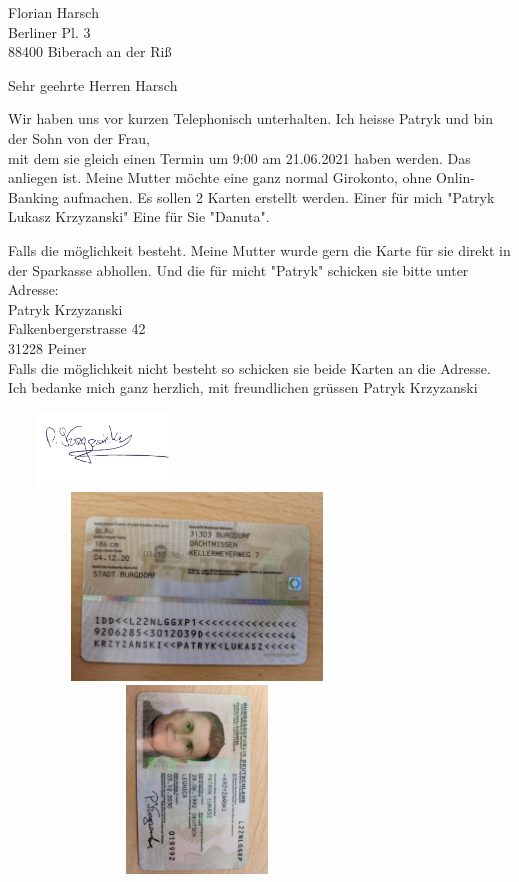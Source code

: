 \documentclass{letter} %
\begin{document}
\begin{letter}{Florian Harsch\\Berliner Pl. 3\\ 88400 Biberach an der Riß\\}
\opening{Sehr geehrte Herren Harsch }
	Wir haben uns vor kurzen Telephonisch unterhalten. Ich heisse Patryk und bin der Sohn von der Frau, \\
	mit dem sie gleich einen Termin um 9:00 am 21.06.2021 haben werden. 
	Das anliegen ist.
	Meine Mutter m\"ochte eine ganz normal Girokonto, ohne Onlin-Banking aufmachen. 
	Es sollen 2 Karten erstellt werden. 
	Einer f\"ur mich "Patryk Lukasz Krzyzanski"
	Eine f\"ur Sie "Danuta".

	Falls die m\"oglichkeit besteht. Meine Mutter wurde gern die Karte f\"ur sie direkt in der Sparkasse abhollen.
	Und die f\"ur micht "Patryk" schicken sie bitte unter Adresse:\\

	Patryk Krzyzanski\\
	Falkenbergerstrasse 42\\
	31228 Peiner\\

	Falls die m\"oglichkeit nicht besteht so schicken sie beide Karten an die Adresse. 
	\\
	Ich bedanke mich ganz herzlich, mit freundlichen gr\"ussen Patryk Krzyzanski

\includegraphics[width=5cm, height=2cm]{podpisMama.jpg}\\
\includegraphics[width=10cm, height=5cm]{1.jpg}\\
\includegraphics[width=10cm, height=5cm]{2.jpg}

\end{letter}
\end{document}
